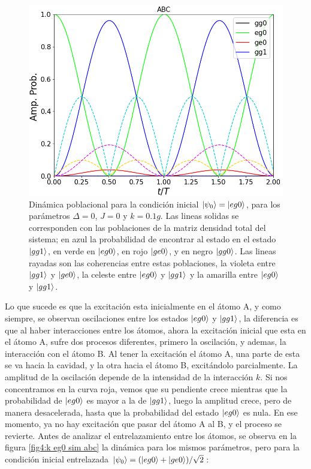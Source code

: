 \begin{figure}[h]
    \begin{minipage}[c]{0.67\textwidth}
        \includegraphics[width=\textwidth]{figuras/ch4/k eg0 ABC.png}
    \end{minipage}\hfill
    \begin{minipage}[c]{0.3\textwidth}
    \caption{Dinámica poblacional para la condición inicial $\ket{\psi_0}=\ket{eg0}$, para los parámetros $\Delta=0$, $J=0$ y $k=0.1g$. Las lineas solidas se corresponden con las poblaciones de la matriz densidad total del sistema; en azul la probabilidad de encontrar al estado en el estado $\ket{gg1}$, en verde en $\ket{eg0}$, en rojo $\ket{ge0}$, y en negro $\ket{gg0}$. Las lineas rayadas son las coherencias entre estas poblaciones, la violeta entre $\ket{gg1}$ y $\ket{ge0}$, la celeste entre $\ket{eg0}$ y $\ket{gg1}$ y la amarilla entre $\ket{eg0}$ y $\ket{gg1}$.
         } \label{fig4:k eg0 abc}
  \end{minipage}
\end{figure}
Lo que sucede es que la excitación esta inicialmente en el átomo A, y como siempre, se observan oscilaciones entre los estados $\ket{eg0}$ y $\ket{gg1}$, la diferencia es que al haber interacciones entre los átomos, ahora la excitación inicial que esta en el átomo A, sufre dos procesos diferentes, primero la oscilación, y ademas, la interacción con el átomo B. Al tener la excitación el átomo A, una parte de esta se va hacia la cavidad, y la otra hacia el átomo B, excitándolo parcialmente. La amplitud de la oscilación depende de la intensidad de la interacción $k$. Si nos concentramos en la curva roja, vemos que su pendiente crece mientras que la probabilidad de $\ket{eg0}$ es mayor a la de $\ket{gg1}$, luego la amplitud crece, pero de manera desacelerada, hasta que la probabilidad del estado $\ket{eg0}$ es nula. En ese momento, ya no hay excitación que pasar del átomo A al B, y el proceso se revierte. Antes de analizar el entrelazamiento entre los átomos, se observa en la figura \ref{fig4:k eg0 sim abc} la dinámica para los mismos parámetros, pero para la condición inicial entrelazada $\ket{\psi_0}=(\ket{eg0}+\ket{ge0})/\sqrt{2}$:
